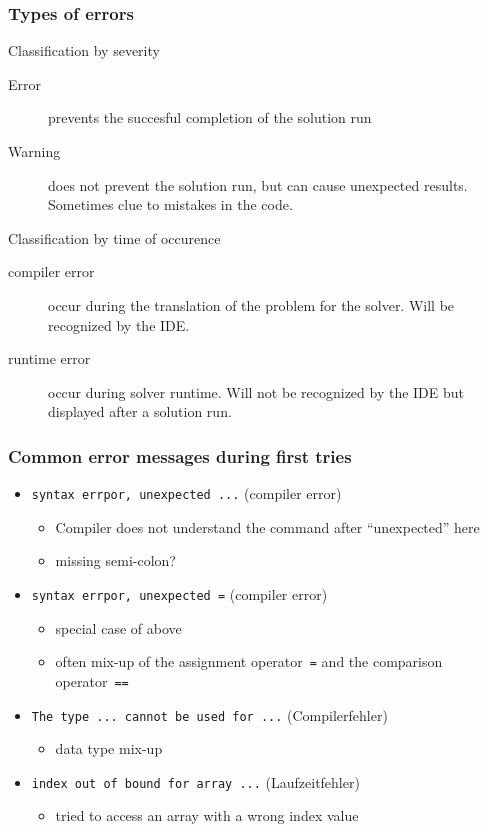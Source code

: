 \begin{frame}
 \frametitle{Types of errors}
 \begin{block}{Classification by severity}
  \begin{description}
   \item[Error] prevents the succesful completion of the solution run
   \item[Warning] does not prevent the solution run, but can cause unexpected results. Sometimes clue to mistakes in the code.
  \end{description}
 \end{block}
 \begin{block}{Classification by time of occurence}
  \begin{description}
   \item[compiler error] occur during the translation of the problem for the solver. Will be recognized by the IDE.
   \item[runtime error] occur during solver runtime. Will not be recognized by the IDE but displayed after a solution run.
  \end{description}
 \end{block}
\end{frame}

\begin{frame}
 \frametitle{Common error messages during first tries}
 \begin{itemize}
  \item \texttt{syntax errpor, unexpected ...} (compiler error)
  \begin{itemize}
   \item Compiler does not understand the command after "`unexpected"' here
   \item missing semi-colon?
  \end{itemize}
  \item \texttt{syntax errpor, unexpected =} (compiler error)
  \begin{itemize}
   \item special case of above
   \item often mix-up of the assignment operator~\texttt{=} and the comparison operator~\texttt{==}
  \end{itemize}
  \item \texttt{The type ... cannot be used for ...} (Compilerfehler)
  \begin{itemize}
   \item data type mix-up
  \end{itemize}
  \item \texttt{index out of bound for array ...} (Laufzeitfehler)
  \begin{itemize}
   \item tried to access an array with a wrong index value
  \end{itemize}
 \end{itemize}
\end{frame}

